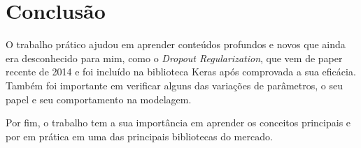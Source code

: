 \section{Conclusão}

O trabalho prático ajudou em aprender conteúdos profundos e novos que ainda era desconhecido para mim, como o \textit{Dropout Regularization}, que vem de paper recente de 2014 e foi incluído na biblioteca Keras após comprovada a sua eficácia. Também foi importante em verificar alguns das variações de parâmetros, o seu papel e seu comportamento na modelagem.

Por fim, o trabalho tem a sua importância em aprender os conceitos principais e por em prática em uma das principais bibliotecas do mercado.






% 

\vfill




